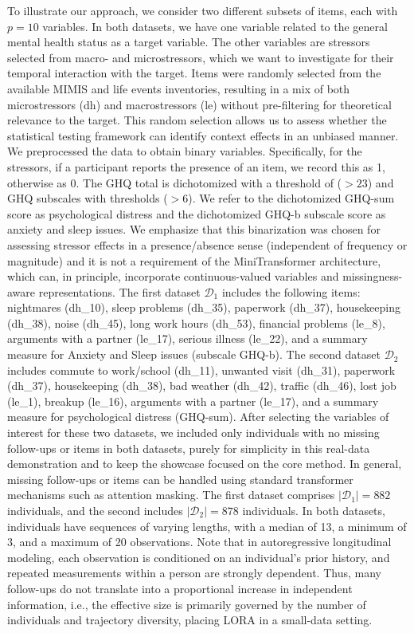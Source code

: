 \documentclass[AMA,Times1COL]{WileyNJDv5} %
\begin{document}
 To illustrate our approach, we consider two different subsets of items, each with \(p = 10\) variables. In both datasets, we have one variable related to the general mental health status as a target variable. The other variables are stressors selected from macro- and microstressors, which we want to investigate for their temporal interaction with the target. Items were randomly selected from the available MIMIS and life events inventories, resulting in a mix of both microstressors (dh) and macrostressors (le) without pre-filtering for theoretical relevance to the target. This random selection allows us to assess whether the statistical testing framework can identify context effects in an unbiased manner. We preprocessed the data to obtain binary variables. Specifically, for the stressors, if a participant reports the presence of an item, we record this as 1, otherwise as 0. The GHQ total is dichotomized with a threshold of (\(>23\)) and GHQ subscales with thresholds (\(>6\)). We refer to the dichotomized GHQ-sum score as psychological distress and the dichotomized GHQ-b subscale score as anxiety and sleep issues. We emphasize that this binarization was chosen for assessing stressor effects in a presence/absence sense (independent of frequency or magnitude) and it is not a requirement of the MiniTransformer architecture, which can, in principle, incorporate continuous-valued variables and missingness-aware representations. The first dataset \(\mathcal{D}_1\) includes the following items: nightmares (dh\_10), sleep problems (dh\_35), paperwork (dh\_37), housekeeping (dh\_38), noise (dh\_45), long work hours (dh\_53), financial problems (le\_8), arguments with a partner (le\_17), serious illness (le\_22), and a summary measure for Anxiety and Sleep issues (subscale GHQ-b). The second dataset \(\mathcal{D}_2\) includes commute to work/school (dh\_11), unwanted visit (dh\_31), paperwork (dh\_37), housekeeping (dh\_38), bad weather (dh\_42), traffic (dh\_46), lost job (le\_1), breakup (le\_16), arguments with a partner (le\_17), and a summary measure for psychological distress (GHQ-sum). After selecting the variables of interest for these two datasets, we included only individuals with no missing follow-ups or items in both datasets, purely for simplicity in this real-data demonstration and to keep the showcase focused on the core method. In general, missing follow-ups or items can be handled using standard transformer mechanisms such as attention masking. The first dataset comprises \(|\mathcal{D}_1| = 882\) individuals, and the second includes \(|\mathcal{D}_2| = 878\) individuals. In both datasets, individuals have sequences of varying lengths, with a median of 13, a minimum of 3, and a maximum of 20 observations. Note that in autoregressive longitudinal modeling, each observation is conditioned on an individual’s prior history, and repeated measurements within a person are strongly dependent. Thus, many follow-ups do not translate into a proportional increase in independent information, i.e., the effective size is primarily governed by the number of individuals and trajectory diversity, placing LORA in a small-data setting.
\end{document}
